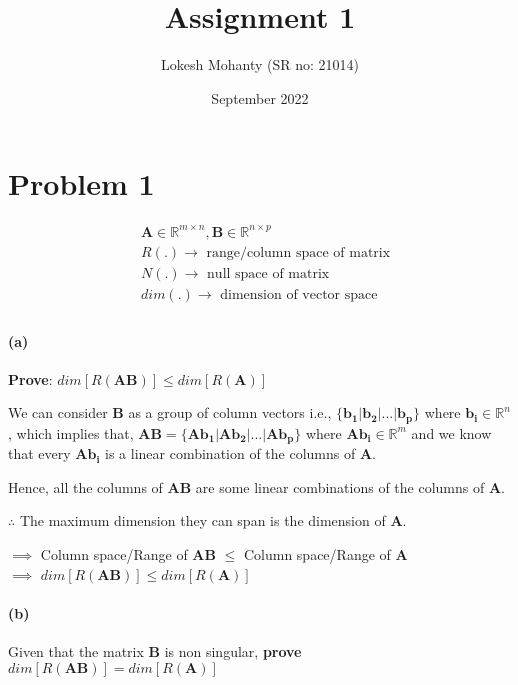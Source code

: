 \documentclass[12pt, letterpaper]{article}
\title{Assignment 1}
\author{Lokesh Mohanty (SR no: 21014)}
\date{September 2022}
\begin{document}
\fontsize{14pt}{18pt}\selectfont

\maketitle

\section*{Problem 1}
\[\begin{split}
  &\mathbf{A} \in \mathbb{R}^{m\times n}, \mathbf{B} \in \mathbb{R}^{n\times p}\\
  &R(.) \rightarrow \text{ range/column space of matrix}\\
  &N(.) \rightarrow \text{ null space of matrix}\\
  &dim(.) \rightarrow \text{ dimension of vector space}\\
\end{split}\]

\paragraph{(a)} \textbf{Prove}: $dim[R(\mathbf{AB})] \leq dim[R(\mathbf{A})]$\newline


We can consider $\mathbf{B}$ as a group of column vectors i.e., $\{ \mathbf{b_1} | \mathbf{b_2} | ... | \mathbf{b_p} \}$ where $\mathbf{b_i} \in \mathbb{R}^n$, which implies that, $\mathbf{AB} = \{ \mathbf{Ab_1} | \mathbf{Ab_2} | ... | \mathbf{Ab_p} \}$ where $\mathbf{Ab_i} \in \mathbb{R}^m$ and we know that every $\mathbf{Ab_i}$ is a linear combination of the columns of $\mathbf{A}$.
\newline

Hence, all the columns of $\mathbf{AB}$ are some linear combinations of the columns of $\mathbf{A}$.
\newline

$\therefore$ The maximum dimension they can span is the dimension of $\mathbf{A}$.
\newline

$\implies$ Column space/Range of \textbf{AB} $\leq$ Column space/Range of \textbf{A}\\
$\implies$ $\boxed{dim[R(\mathbf{AB})] \leq dim[R(\mathbf{A})]}$

\paragraph{(b)} Given that the matrix \textbf{B} is non singular, \textbf{prove} $dim[R(\mathbf{AB})] = dim[R(\mathbf{A})]$\newline
\end{document}
